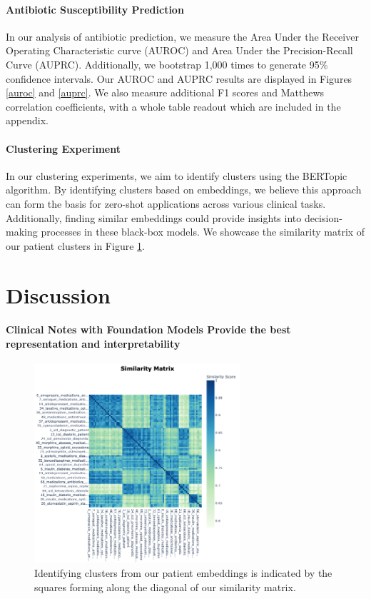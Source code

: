 \documentclass{article}
\theoremstyle{plain}
\theoremstyle{definition}
\theoremstyle{remark}
\begin{document}
\paragraph{Antibiotic Susceptibility Prediction} In our analysis of antibiotic prediction, we measure the Area Under the Receiver Operating Characteristic curve (AUROC) and Area Under the Precision-Recall Curve (AUPRC). Additionally, we bootstrap 1,000 times to generate 95\% confidence intervals. Our AUROC and AUPRC results are displayed in Figures \ref{auroc} and \ref{auprc}. We also measure additional F1 scores and Matthews correlation coefficients, with a whole table readout which are included in the appendix.

\paragraph{Clustering Experiment} In our clustering experiments, we aim to identify clusters using the BERTopic algorithm. By identifying clusters based on embeddings, we believe this approach can form the basis for zero-shot applications across various clinical tasks. Additionally, finding similar embeddings could provide insights into decision-making processes in these black-box models. We showcase the similarity matrix of our patient clusters in Figure \ref{sim}.

\section{Discussion}

\paragraph{Clinical Notes with Foundation Models Provide the best representation and interpretability}

\begin{figure}[t!]
\begin{center}
\centerline{\includegraphics[width=3in]{similarity.png}}
\caption{Identifying clusters from our patient embeddings is indicated by the squares forming along the diagonal of our similarity matrix.}
\label{sim}
\end{center}
\vspace{-1cm}
\end{figure}
\end{document}
